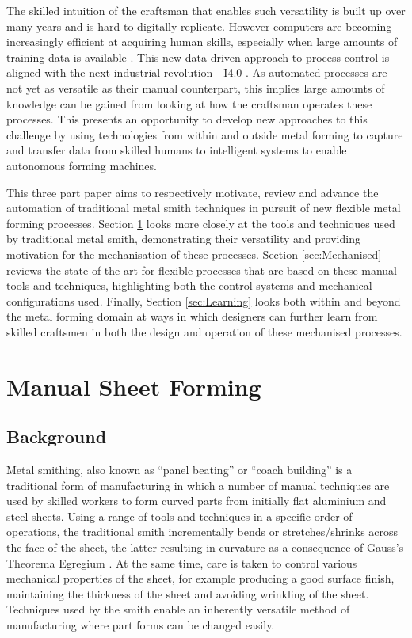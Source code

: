 The skilled intuition of the craftsman that enables such versatility is built up over many years and is hard to digitally replicate. However computers are becoming increasingly efficient at acquiring human skills, especially when large amounts of training data is available \citep{Ford2016TheUnemployment}. This new data driven approach to process control is aligned with the next industrial revolution - I4.0 \citep{Zhong2017IntelligentReview}. %
As automated processes are not yet as versatile as their manual counterpart, this implies large amounts of knowledge can be gained from looking at how the craftsman operates these processes. This presents an opportunity to develop new approaches to this challenge by using technologies from within and outside metal forming to capture and transfer data from skilled humans to intelligent systems to enable autonomous forming machines.

This three part paper aims to respectively motivate, review and advance the automation of traditional metal smith techniques in pursuit of new flexible metal forming processes. Section \ref{sec:Manual} looks more closely at the tools and techniques used by traditional metal smith, demonstrating their versatility and providing motivation for the mechanisation of these processes. Section \ref{sec:Mechanised} reviews the state of the art for flexible processes that are based on these manual tools and techniques, highlighting both the control systems and mechanical configurations used. Finally, Section \ref{sec:Learning} looks both within and beyond the metal forming domain at ways in which designers can further learn from skilled craftsmen in both the design and operation of these mechanised processes.


\newpage
\section{Manual Sheet Forming}\label{sec:Manual}
\subsection{Background}
Metal smithing, also known as ``panel beating'' or ``coach building'' is a traditional form of manufacturing in which a number of manual techniques are used by skilled workers to form curved parts from initially flat aluminium and steel sheets. Using a range of tools and techniques in a specific order of operations, the traditional smith incrementally bends or stretches/shrinks across the face of the sheet, the latter resulting in curvature as a consequence of Gauss's Theorema Egregium \citep{Pressley2001ElementaryGeometry}. At the same time, care is taken to control various mechanical properties of the sheet, for example producing a good surface finish, maintaining the thickness of the sheet and avoiding wrinkling of the sheet. Techniques used by the smith enable an inherently versatile method of manufacturing where part forms can be changed easily.

